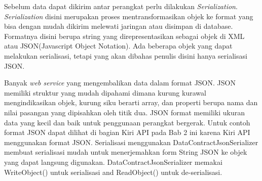 \hspace{0.5cm} Sebelum data dapat dikirim antar perangkat perlu dilakukan \textit{Serialization}. \textit{Serialization} disini merupakan proses mentransformasikan objek ke format yang bisa dengan mudah dikirim melewati jaringan atau disimpan di database. Formatnya disini berupa string yang direpresentasikan sebagai objek di XML atau JSON(Javascript Object Notation). Ada beberapa objek yang dapat melakukan serialisasi, tetapi yang akan dibahas penulis disini hanya serialisasi JSON. 

\hspace{0.5cm} Banyak \textit{web service} yang mengembalikan data dalam format JSON. JSON memiliki struktur yang mudah dipahami dimana kurung kurawal mengindikasikan objek, kurung siku berarti array, dan properti berupa nama dan nilai pasangan yang dipisahkan oleh titik dua. JSON format memiliki ukuran data yang kecil dan baik untuk penggunaan perangkat bergerak. Untuk contoh format JSON dapat dilihat di bagian Kiri API pada Bab 2 ini karena Kiri API menggunakan format JSON. Serialisasi menggunakan DataContractJsonSerializer membuat serialisasi mudah untuk menerjemahkan form String JSON ke objek yang dapat langsung digunakan. DataContractJsonSerializer memakai WriteObject() untuk serialisasi and ReadObject() untuk de-serialisasi.

